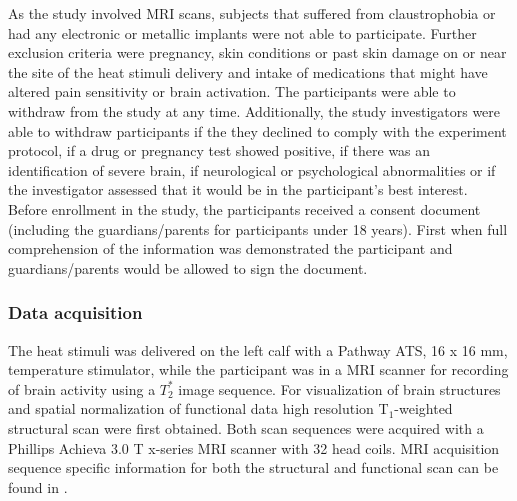As the study involved MRI scans, subjects that suffered from claustrophobia or had any electronic or metallic implants were not able to participate. Further exclusion criteria were pregnancy, skin conditions or past skin damage on or near the site of the heat stimuli delivery and intake of medications that might have altered pain sensitivity or brain activation. The participants were able to withdraw from the study at any time. Additionally, the study investigators were able to withdraw participants if the they declined to comply with the experiment protocol, if a drug or pregnancy test showed positive, if there was an identification of severe brain, if neurological or psychological abnormalities or if the investigator assessed that it would be in the participant's best interest. \\
Before enrollment in the study, the participants received a consent document (including the guardians/parents for participants under 18 years). First when full comprehension of the information was demonstrated the participant and guardians/parents would be allowed to sign the document.

\subsubsection{Data acquisition} \label{ac} 

The heat stimuli was delivered on the left calf with a Pathway ATS, 16 x 16 mm, temperature stimulator, while the participant was in a MRI scanner for recording of brain activity using a $T_{2}^*$ image sequence. For visualization of brain structures and spatial normalization of functional data high resolution T$_1$-weighted structural scan were first obtained. Both scan sequences were acquired with a Phillips Achieva 3.0 T x-series MRI scanner with 32 head coils. MRI acquisition sequence specific information for both the structural and functional scan can be found in .   

